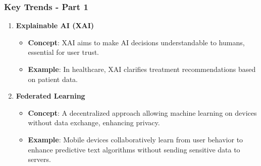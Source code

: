 \documentclass{beamer}
\begin{document}
\begin{frame}[fragile]
    \frametitle{Key Trends - Part 1}
    \begin{enumerate}
        \item \textbf{Explainable AI (XAI)}
        \begin{itemize}
            \item \textbf{Concept}: XAI aims to make AI decisions understandable to humans, essential for user trust.
            \item \textbf{Example}: In healthcare, XAI clarifies treatment recommendations based on patient data.
        \end{itemize}

        \item \textbf{Federated Learning}
        \begin{itemize}
            \item \textbf{Concept}: A decentralized approach allowing machine learning on devices without data exchange, enhancing privacy.
            \item \textbf{Example}: Mobile devices collaboratively learn from user behavior to enhance predictive text algorithms without sending sensitive data to servers.
        \end{itemize}
    \end{enumerate}
\end{frame}
\end{document}
